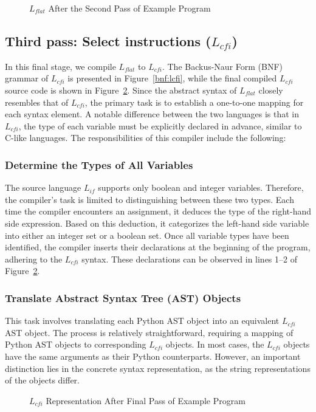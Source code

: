 \begin{figure}[h!]
	
	\caption{$L_{flat}$ After the Second Pass of Example Program}
	\label{code:flat}
\end{figure}


\subsection{Third pass: Select instructions ($L_{cfi}$)}

In this final stage, we compile $L_{flat}$ to $L_{cfi}$. The Backus-Naur Form (BNF) grammar of $L_{cfi}$ is presented in Figure~\ref{bnf:lcfi}, while the final compiled $L_{cfi}$ source code is shown in Figure~\ref{code:lcfi}. Since the abstract syntax of $L_{flat}$ closely resembles that of $L_{cfi}$, the primary task is to establish a one-to-one mapping for each syntax element. A notable difference between the two languages is that in $L_{cfi}$, the type of each variable must be explicitly declared in advance, similar to C-like languages. The responsibilities of this compiler include the following:

\subsubsection{Determine the Types of All Variables}
The source language $L_{if}$ supports only boolean and integer variables. Therefore, the compiler's task is limited to distinguishing between these two types. Each time the compiler encounters an assignment, it deduces the type of the right-hand side expression. Based on this deduction, it categorizes the left-hand side variable into either an integer set or a boolean set. Once all variable types have been identified, the compiler inserts their declarations at the beginning of the program, adhering to the $L_{cfi}$ syntax. These declarations can be observed in lines 1–2 of Figure~\ref{code:lcfi}.

\subsubsection{Translate Abstract Syntax Tree (AST) Objects}
This task involves translating each Python AST object into an equivalent $L_{cfi}$ AST object. The process is relatively straightforward, requiring a mapping of Python AST objects to corresponding $L_{cfi}$ objects. In most cases, the $L_{cfi}$ objects have the same arguments as their Python counterparts. However, an important distinction lies in the concrete syntax representation, as the string representations of the objects differ.

\begin{figure}[h!]
	
	\caption{$L_{cfi}$ Representation After Final Pass of Example Program}
	\label{code:lcfi}
\end{figure}

